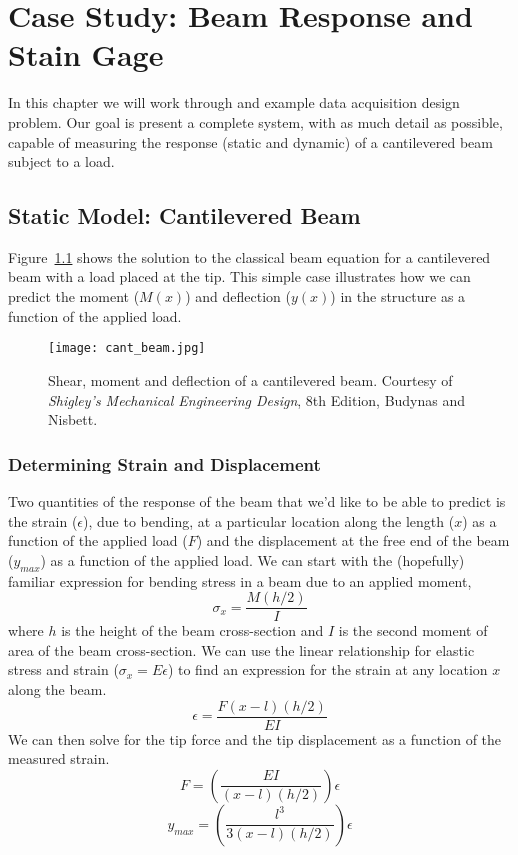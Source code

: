 \chapter{Case Study: Beam Response and Stain Gage}\label{c:strain}

In this chapter we will work through and example data acquisition design problem.  Our goal is present a complete system, with as much detail as possible, capable of measuring the response (static and dynamic) of a cantilevered beam subject to a load.

\section{Static Model: Cantilevered Beam}

Figure~\ref{f:cant} shows the solution to the classical beam equation for a cantilevered beam with a load placed at the tip.  This simple case illustrates how we can predict the moment ($M(x)$) and deflection ($y(x)$) in the structure as a function of the applied load.

\begin{figure}[hb!]
\centerline{
{\texttt{[image: cant\_beam.jpg]}}}
\caption{Shear, moment and deflection of a cantilevered beam.  Courtesy of \emph{Shigley's Mechanical Engineering Design}, 8th Edition, Budynas and Nisbett.}
\label{f:cant}
\end{figure}


\subsection{Determining Strain and Displacement}
Two quantities of the response of the beam that we'd like to be able to predict is the strain ($\epsilon$), due to bending, at a particular location along the length ($x$) as a function of the applied load ($F$) and the displacement at the free end of the beam ($y_{max}$) as a function of the applied load.  We can start with the (hopefully) familiar expression for bending stress in a beam due to an applied moment,
\[
\sigma_x=\frac{M(h/2)}{I}
\]
where $h$ is the height of the beam cross-section and $I$ is the second moment of area of the beam cross-section.  We can use the linear relationship for elastic stress and strain ($\sigma_x = E \epsilon$) to find an expression for the strain at any location $x$ along the beam.
\[
\epsilon = \frac{F(x-l)(h/2)}{EI}
\]
We can then solve for the tip force and the tip displacement as a function of the measured strain.
\[ F = \left( \frac{EI}{(x-l)(h/2)} \right) \epsilon \]
\[ y_{max}=\left( \frac{l^3}{3(x-l)(h/2)} \right) \epsilon \]


